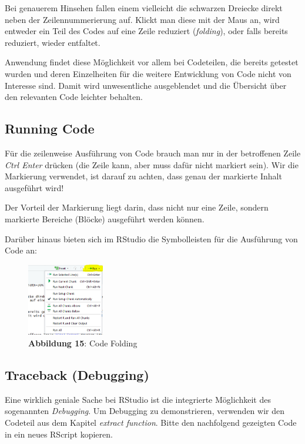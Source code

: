 \documentclass[]{article}
\begin{document}
Bei genauerem Hinsehen fallen einem vielleicht die schwarzen Dreiecke
direkt neben der Zeilennummerierung auf. Klickt man diese mit der Maus
an, wird entweder ein Teil des Codes auf eine Zeile reduziert
(\emph{folding}), oder falls bereits reduziert, wieder entfaltet.

Anwendung findet diese Möglichkeit vor allem bei Codeteilen, die bereits
getestet wurden und deren Einzelheiten für die weitere Entwicklung von
Code nicht von Interesse sind. Damit wird unwesentliche ausgeblendet und
die Übersicht über den relevanten Code leichter behalten.

\subsection*{Running Code}\label{running-code}

Für die zeilenweise Ausführung von Code brauch man nur in der
betroffenen Zeile \emph{Ctrl Enter} drücken (die Zeile kann, aber muss
dafür nicht markiert sein). Wir die Markierung verwendet, ist darauf zu
achten, dass genau der markierte Inhalt ausgeführt wird!

Der Vorteil der Markierung liegt darin, dass nicht nur eine Zeile,
sondern markierte Bereiche (Blöcke) ausgeführt werden können.

Darüber hinaus bieten sich im RStudio die Symbolleisten für die
Ausführung von Code an:

\begin{figure}
\centering
\includegraphics[width=0.30000\textwidth]{Images/03_R_RunSymbol.PNG}
\caption{\textbf{Abbildung 15}: Code Folding}
\end{figure}

\subsection*{Traceback (Debugging)}\label{traceback-debugging}

Eine wirklich geniale Sache bei RStudio ist die integrierte Möglichkeit
des sogenannten \emph{Debugging}. Um Debugging zu demonstrieren,
verwenden wir den Codeteil aus dem Kapitel \emph{extract function}.
Bitte den nachfolgend gezeigten Code in ein neues RScript kopieren.
\end{document}
